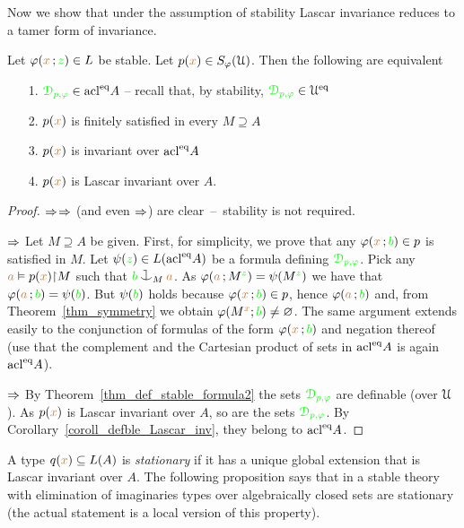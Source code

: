 Now we show that under the assumption of stability Lascar invariance reduces to a tamer form of invariance.

\begin{proposition}\label{prop_type_over_acl2}
  Let $\varphi({\color{brown} x}\,;{\color{green} z})\in L$ be stable.
  Let $p({\color{brown} x})\in S_\varphi(\EuScript U)$. 
  Then the following are equivalent
  \begin{itemize}
  \item[1.] ${\color{green}\EuScript D_{p,\varphi}}\in \mathop{\rm acl}^{{\rm eq}}\!A$ -- recall that, by stability, ${\color{green}\EuScript D_{p,\varphi}}\in\EuScript U^{{\rm eq}}$
  \item[2.] $p({\color{brown} x})$ is finitely satisfied in every $M\supseteq A$
  \item[3.] $p({\color{brown} x})$ is invariant over $\mathop{\rm acl}^{{\rm eq}}\!A$
  \item[4.] $p({\color{brown} x})$ is Lascar invariant over $A$.
  \end{itemize}
\end{proposition}
\begin{proof}
  $\Rightarrow$$\Rightarrow$ (and even $\Rightarrow$) are clear~--~stability is not required.

  $\Rightarrow$
  Let $M\supseteq A$ be given.
  First, for simplicity, we prove that any $\varphi({\color{brown} x}\,;{\color{green} b})\in p$ is satisfied in $M$.
  Let $\psi({\color{green} z})\in L(\mathop{\rm acl}^{{\rm eq}}\!A)$ be a formula defining ${\color{green}\EuScript D_{p,\varphi}}$.
  Pick any ${\color{brown} a}\vDash p({\color{brown} x}){\restriction} M$ such that ${\gr b}\cnonfork_M{\mr a}$.
  As $\varphi({\color{brown} a}\,;M^{\color{green} z})=\psi(M^{\color{green} z})$ we have that $\varphi({\color{brown} a}\,;{\color{green} b})=\psi({\color{green} b})$.
  But $\psi({\color{green} b})$ holds because $\varphi({\color{brown} x}\,;{\color{green} b})\in p$, hence $\varphi({\color{brown} a}\,;{\color{green} b})$ and, from Theorem~\ref{thm_symmetry} we obtain $\varphi(M^{\color{brown} x};{\color{green} b})\neq\varnothing$.
  The same argument extends easily to the conjunction of formulas of the form $\varphi({\color{brown} x}\,;{\color{green} b})$ and negation thereof (use that the complement and the Cartesian product of sets in $\mathop{\rm acl}^{{\rm eq}}\!A$ is again $\mathop{\rm acl}^{{\rm eq}}\!A$).
 
  $\Rightarrow$ By Theorem~\ref{thm_def_stable_formula2} the sets ${\color{green}\EuScript D_{p,\varphi}}$ are definable (over $\EuScript U$).
  As $p({\color{brown} x})$ is Lascar invariant over $A$, so are the sets ${\color{green}\EuScript D_{p,\varphi}}$.
  By Corollary~\ref{coroll_defble_Lascar_inv}, they belong to $\mathop{\rm acl}^{{\rm eq}}\!A$.
\end{proof}

A type $q({\color{brown} x})\subseteq L(A)$ is \emph{stationary\/} if it has a unique global extension that is Lascar invariant over $A$.
The following proposition says that in a stable theory with elimination of imaginaries types over algebraically closed sets are stationary (the actual statement is a local version of this property).

